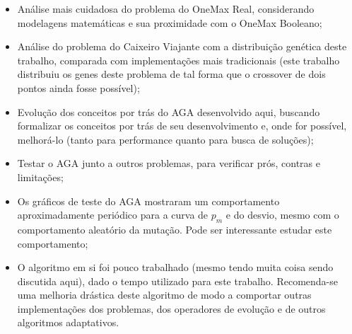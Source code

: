 \begin{itemize}

	\item Análise mais cuidadosa do problema do OneMax Real, considerando modelagens matemáticas e sua proximidade com o OneMax Booleano;

	\item Análise do problema do Caixeiro Viajante com a distribuição genética deste trabalho, comparada com implementações mais tradicionais (este trabalho distribuiu os genes deste problema de tal forma que o crossover de dois pontos ainda fosse possível);

	\item Evolução dos conceitos por trás do AGA desenvolvido aqui, buscando formalizar os conceitos por trás de seu desenvolvimento e, onde for possível, melhorá-lo (tanto para performance quanto para busca de soluções);

	\item Testar o AGA junto a outros problemas, para verificar prós, contras e limitações;

	\item Os gráficos de teste do AGA mostraram um comportamento aproximadamente periódico para a curva de $p_m$ e do desvio, mesmo com o comportamento aleatório da mutação. Pode ser interessante estudar este comportamento;

	\item O algoritmo em si foi pouco trabalhado (mesmo tendo muita coisa sendo discutida aqui), dado o tempo utilizado para este trabalho. Recomenda-se uma melhoria drástica deste algoritmo de modo a comportar outras implementações dos problemas, dos operadores de evolução e de outros algoritmos adaptativos.

\end{itemize}
